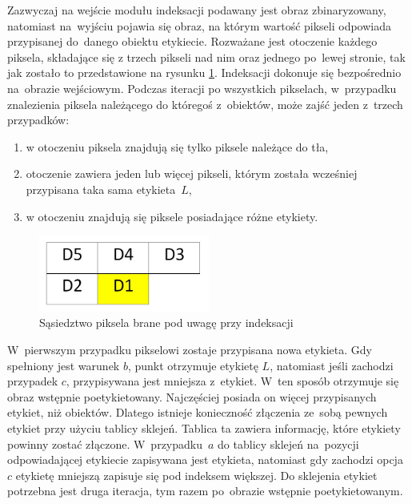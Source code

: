 
Zazwyczaj na wejście modułu indeksacji podawany jest obraz zbinaryzowany, natomiast na~wyjściu pojawia się obraz, na którym  wartość  pikseli odpowiada przypisanej do~danego obiektu etykiecie. 
Rozważane jest otoczenie każdego piksela, składające się z trzech pikseli nad nim oraz jednego po~lewej stronie, tak jak zostało to przedstawione na rysunku \ref{fig:ind_sasiedztwo}. 
Indeksacji dokonuje się bezpośrednio na~obrazie wejściowym. 
Podczas iteracji po wszystkich pikselach, w~przypadku znalezienia piksela należącego do któregoś z~obiektów, może zajść jeden z~trzech przypadków:
\begin{enumerate}[label=(\alph*)]
	\item w otoczeniu piksela znajdują się tylko piksele należące do tła,
	\item otoczenie zawiera jeden lub więcej pikseli, którym została wcześniej przypisana taka sama etykieta~$L$,
	\item w otoczeniu znajdują się piksele posiadające różne etykiety.
\end{enumerate} 
\begin{figure}[h]
	\centering
	\includegraphics[width=0.5\textwidth]{ind_sasiedztwo.jpg}
	\caption{Sąsiedztwo piksela brane pod uwagę przy indeksacji}
	\label{fig:ind_sasiedztwo}
\end{figure}

W~pierwszym przypadku pikselowi zostaje przypisana nowa etykieta. 
Gdy spełniony jest warunek $b$, punkt otrzymuje etykietę $L$, natomiast jeśli zachodzi przypadek $c$, przypisywana jest mniejsza z~etykiet. 
W~ten sposób otrzymuje się obraz wstępnie poetykietowany. 
Najczęściej posiada on więcej przypisanych etykiet, niż obiektów. 
Dlatego istnieje konieczność złączenia ze~sobą pewnych etykiet przy użyciu tablicy sklejeń. 
Tablica ta zawiera informację, które etykiety powinny zostać złączone. 
W~przypadku~$a$ do tablicy sklejeń na~pozycji odpowiadającej etykiecie zapisywana jest etykieta, natomiast gdy zachodzi opcja~$c$ etykietę mniejszą zapisuje się pod indeksem większej. 
Do sklejenia etykiet potrzebna jest druga iteracja, tym razem po~obrazie wstępnie poetykietowanym.\\

